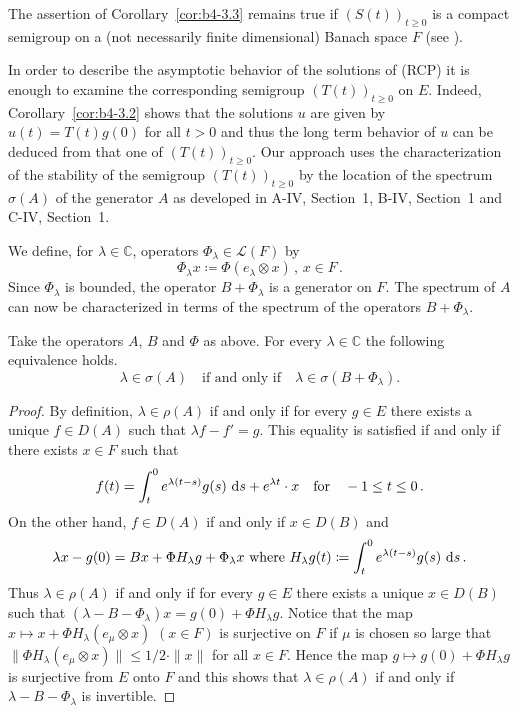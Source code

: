 The assertion of Corollary~\ref{cor:b4-3.3} remains true if $(S(t))_{t \geq 0}$ is a compact semigroup on a (not necessarily finite dimensional) Banach space $F$ (see \citet{traviswebb:1974}).

In order to describe the asymptotic behavior of the solutions of (RCP) it is enough to examine the corresponding semigroup $(T(t))_{t \geq 0}$ on $E$. 
Indeed, Corollary~\ref{cor:b4-3.2} shows that the solutions $u$ are given by $u(t) = T(t)g(0)$ for all $t > 0$ and thus the long term behavior of $u$ can be deduced from that one of $(T(t))_{t \geq 0}$. 
Our approach uses the characterization of the stability of the semigroup $(T(t))_{t \geq 0}$ by the location of the spectrum $\sigma(A)$ of the generator $A$ as developed in A-IV, Section~1, B-IV, Section~1 and C-IV, Section~1.

We define, for $\lambda \in \mathbb{C}$, operators $\Phi_\lambda \in \mathcal{L}(F)$ by
\begin{equation}\label{eq:b4-3.3}
	\Phi_\lambda x  \coloneq  \Phi(e_\lambda \otimes x) \, , \, x \in F \, .
\end{equation}
Since $\Phi_\lambda$ is bounded, the operator $B + \Phi_\lambda$ is a generator on $F$. 
The spectrum of $A$ can now be characterized in terms of the spectrum of the operators $B + \Phi_\lambda$.
%

\begin{proposition}\label{prop:b4-3.4}
	Take the operators $A$, $B$ and $\Phi$ as above. 
    For every $\lambda \in \mathbb{C}$ the following equivalence holds. 
	\begin{equation}\label{eq:b4-3.4}
		\lambda \in \sigma(A) \quad \text{if and only if} \quad \lambda \in \sigma(B + \Phi_\lambda).
	\end{equation}
\end{proposition}

\begin{proof} By definition, $\lambda \in \rho(A)$ if and only if for every $g \in E$ there exists a unique $f \in D(A)$ such that $\lambda f - f' = g$. 
This equality is satisfied if and only if there exists $x \in F$ such that
\[
f(t) = \int_t^0 e^{\lambda(t-s)} g(s) \,\mathop{}\!\mathrm{d}{s} + e^{\lambda t} \cdot x \quad \text{for} \quad -1 \leq t \leq 0  \,.
\]
On the other hand, $f \in D(A)$ if and only if $x \in D(B)$ and
\[
\text{$\lambda x - g(0) = Bx + \Phi H_\lambda g + \Phi_\lambda x$ where $H_\lambda g(t) \coloneq  \int_t^0 e^{\lambda(t-s)} g(s) \,\mathop{}\!\mathrm{d}{s}\,.$}
\]
Thus $\lambda \in \rho(A)$ if and only if for every $g \in E$ there exists a unique $x \in D(B)$ such that $(\lambda - B - \Phi_\lambda)x = g(0) + \Phi H_\lambda g$. 
Notice that the map $x \mapsto x + \Phi H_\lambda(e_\mu \otimes x)$ $(x \in F)$ is surjective on $F$ if $\mu$ is chosen so large that $\|\Phi H_\lambda(e_\mu \otimes x)\| \leq 1/2 \cdot \|x\|$ for all $x \in F$. 
Hence the map $g \mapsto g(0) + \Phi H_\lambda g$ is surjective from $E$ onto $F$ and this shows that $\lambda \in \rho(A)$ if and only if $\lambda - B - \Phi_\lambda$ is invertible.
\end{proof}

